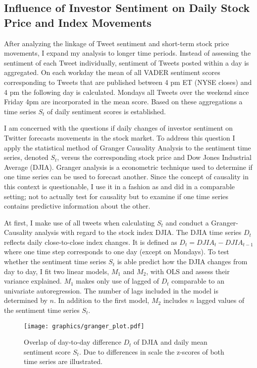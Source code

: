 \documentclass[a4paper,12pt]{article}%
\begin{document}
\subsection{Influence of Investor Sentiment on Daily Stock Price and Index Movements \label{granger_vader}}
After analyzing the linkage of Tweet sentiment and short-term stock price movements, I expand my analysis to longer time periods. Instead of assessing the sentiment of each Tweet individually, sentiment of Tweets posted within a day is aggregated. On each workday the mean of all VADER sentiment scores corresponding to Tweets that are published between 4 pm ET (NYSE closes) and 4 pm the following day is calculated. Mondays all Tweets over the weekend since Friday 4pm are incorporated in the mean score. Based on these aggregations a time series $S_t$ of daily sentiment scores is established.

I am concerned with the questions if daily changes of investor sentiment on Twitter forecasts movements in the stock market. To address this question I apply the statistical method of Granger Causality Analysis to the sentiment time series, denoted $S_t$, versus the corresponding stock price and Dow Jones Industrial Average (DJIA). Granger analysis is a econometric technique used to determine if one time series can be used to forecast another. Since the concept of causality in this context is questionable, I use it in a fashion as \citet{Gilbert2010} and \citet{Bollen2011} did in a comparable setting; not to actually test for causality but to examine if one time series contains predictive information about the other.

At first, I make use of all tweets when calculating $S_t$ and conduct a Granger-Causality analysis with regard to the stock index DJIA. The DJIA time series $D_t$ reflects daily close-to-close index changes. It is defined as $D_t = DJIA_t - DJIA_{t-1}$ where one time step corresponds to one day (except on Mondays).
To test whether the sentiment time series $S_t$ is able predict how the DJIA changes from day to day, I fit two linear models, $M_1$ and $M_2$, with OLS and assess their variance explained. $M_1$ makes only use of lagged of $D_t$ comparable to an univariate autoregression. The number of lags included in the model is determined by $n$. In addition to the first model, $M_2$ includes $n$ lagged values of the sentiment time series $S_t$.

\begin{figure}
\captionsetup{justification=centering}
\centering
\texttt{[image: graphics/granger\_plot.pdf]}
\caption[DJIA Changes and Daily Sentiment Scores - Time Series Plot]{Overlap of day-to-day difference $D_t$ of DJIA and daily mean sentiment score $S_t$. Due to differences in scale the z-scores of both time series are illustrated. \label{fig:comp_momentum_adadelta}}
\end{figure}
\end{document}
